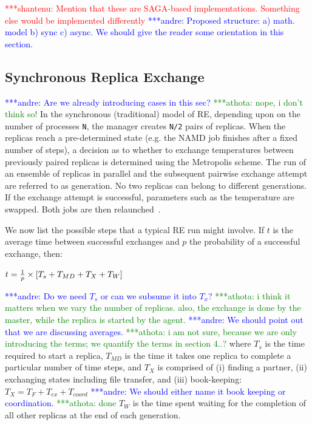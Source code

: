 \documentclass{rspublic}
\newcommand{\jhanote}[1]{ {\textcolor{red} { ***shantenu: #1 }}}
\newcommand{\alnote}[1]{ {\textcolor{blue} { ***andre: #1 }}}
\newcommand{\athotanote}[1]{ {\textcolor{green} { ***athota: #1 }}}
\newcommand{\alnote}[1]{}
\newcommand{\athotanote}[1]{}
\newcommand{\jhanote}[1]{}
\begin{document}


\jhanote{Mention that these are SAGA-based implementations. Something
  else would be implemented differently}
\alnote{Proposed structure: a) math. model b) sync c) async. We should give the reader some orientation in this section.}

\subsection{Synchronous Replica Exchange}

\alnote{Are we already introducing cases in this sec?} \athotanote{nope, i don't think so!}
In the synchronous (traditional) model of RE, depending upon
on the number of processes \texttt{N}, the manager creates \texttt{N/2} pairs
of replicas. When the replicas reach a
pre-determined state (e.g. the NAMD job finishes after a fixed number
of steps), a decision as to whether to exchange temperatures between
previously paired replicas is determined using the Metropolis scheme.
The run of an ensemble of replicas in parallel and the subsequent
pairwise exchange attempt are referred to as generation. No two
replicas can belong to different generations. If the exchange attempt
is successful, parameters such as the temperature are swapped. Both
jobs are then relaunched~\citep{Luckow:2008fp}.

We now list the possible steps that a typical RE run might involve. If $t$ is the average time between successful exchanges and $p$ the probability of a successful exchange, then:

$t =  {1 \over p} \times {[T_s+T_{MD} + T_{X} + T_{W}]}$

\alnote{Do we need $T_{s}$ or can we subsume it into $T_{x}$?}
\athotanote{i think it matters when we vary the number of replicas. also, the exchange is done by the master, while the replica is started by the agent.}
\alnote{We should point out that we are discussing averages.}\athotanote{i am not sure, because we are only introducing the terms; we quantify the terms in section 4..?}
where $T_{s}$ is the time required to start a replica, $T_{MD}$ is the time 
it takes one replica to complete a particular number of time steps,
and $T_{X}$ is comprised of (i) finding a partner, (ii) exchanging
states including file transfer, and (iii) book-keeping: ${T_{X}} = {T_F + T_{ex} + T_{coord}}$ \alnote{We should either name it
book keeping or coordination.}\athotanote{done} $T_{W}$ is the time spent waiting for the completion
of all other replicas at the end of each generation.
\end{document}
